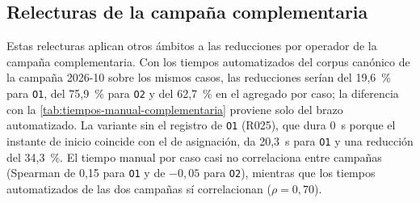 \subsection{Relecturas de la campaña complementaria}\label{subsec:anexo-sensibilidad-campana}

Estas relecturas aplican otros ámbitos a las reducciones por operador de la campaña complementaria. Con los tiempos automatizados del corpus canónico de la campaña 2026-10 sobre los mismos casos, las reducciones serían del 19,6~\% para \texttt{O1}, del 75,9~\% para \texttt{O2} y del 62,7~\% en el agregado por caso; la diferencia con la \autoref{tab:tiempos-manual-complementaria} proviene solo del brazo automatizado. La variante sin el registro de \texttt{O1} (R025), que dura 0~s porque el instante de inicio coincide con el de asignación, da 20,3~s para \texttt{O1} y una reducción del 34,3~\%. El tiempo manual por caso casi no correlaciona entre campañas (Spearman de 0,15 para \texttt{O1} y de \(-0{,}05\) para \texttt{O2}), mientras que los tiempos automatizados de las dos campañas sí correlacionan (\(\rho = 0{,}70\)).
